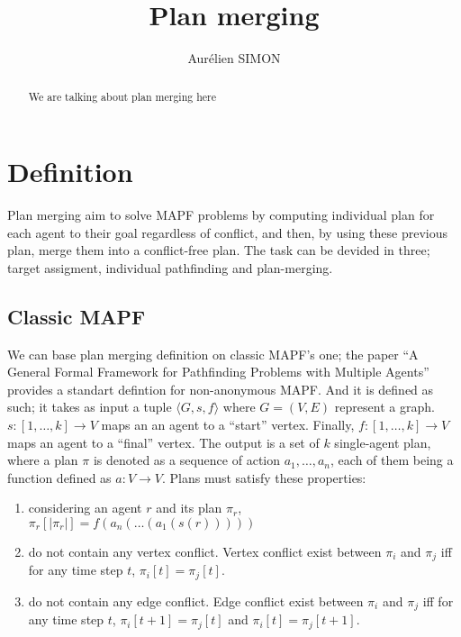 \documentclass{llncs}
\begin{document}
\title{Plan merging}

\author{Aurélien SIMON}
\maketitle

\begin{abstract}
We are talking about plan merging here
\end{abstract}


\newpage
\section{Definition}

Plan merging aim to solve MAPF\cite{classical_mapf}\cite{mapf_intro} problems by computing individual plan for each agent to their goal regardless of conflict, and then, by using these previous plan, merge them into a conflict-free plan. The task can be devided in three; target assigment, individual pathfinding and plan-merging. 

\subsection{Classic MAPF}
We can base plan merging definition on classic MAPF's one; the paper ``A General Formal Framework for Pathfinding Problems with Multiple Agents''\cite{classical_mapf} provides a standart defintion for non-anonymous MAPF\@. And it is defined as such; it takes as input a tuple \(\langle G,s,f \rangle \) where \(G=(V,E)\) represent a graph.  \(s : [1,\ldots,k] \rightarrow V\) maps an an agent to a  ``start'' vertex. Finally,  \(f : [1,\ldots,k] \rightarrow V\) maps an agent to a ``final'' vertex. The output is a set of \(k\) single-agent plan, where a plan \(\pi\) is denoted as a sequence of action \(a_1,\ldots,a_n\), each of them being a function defined as \(a : V \rightarrow V\). Plans must satisfy these properties:

\begin{enumerate}
    \item\label{plan_prop_end_start_pos} considering an agent \(r\) and its plan \(\pi_r\), \(\pi_r[|\pi_r|] = f(a_n(\ldots(a_1(s(r)))))\)
    
    \item\label{plan_prop_vertex}  do not contain any vertex conflict. Vertex conflict exist between \(\pi_i\) and \(\pi_j\) iff for any time step \(t\), \(\pi_i[t] = \pi_j[t]\).

    \item\label{plan_prop_edge} do not contain any edge conflict. Edge conflict exist between \(\pi_i\) and \(\pi_j\) iff for any time step \(t\), \(\pi_i[t+1] = \pi_j[t]\) and \(\pi_i[t] = \pi_j[t+1]\).
\end{enumerate}
\end{document}
